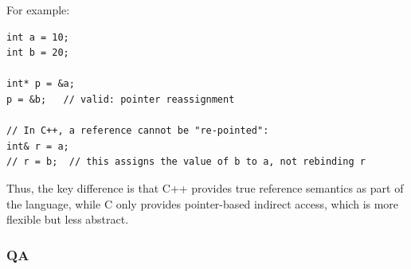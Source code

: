 \documentclass[10pt]{article}
\begin{document}
For example:

\begin{verbatim}
int a = 10;
int b = 20;

int* p = &a;
p = &b;   // valid: pointer reassignment

// In C++, a reference cannot be "re-pointed":
int& r = a;
// r = b;  // this assigns the value of b to a, not rebinding r
\end{verbatim}

Thus, the key difference is that C++ provides true reference semantics as part of the language, while C only provides pointer-based indirect access, which is more flexible but less abstract.

\newpage
\subsubsection{QA}
\end{document}
